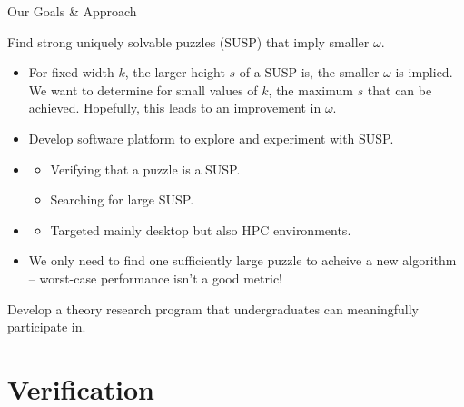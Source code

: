 \documentclass[t,10pt,
mathserif,xcolor=dvipsnames]{beamer}
\begin{document}
\begin{myframe}{Our Goals \& Approach}

   Find strong uniquely solvable puzzles (SUSP) that imply smaller $\omega$.

  \medskip
  
  \begin{itemize}
  \item For fixed width $k$, the larger height $s$ of a SUSP is, the
    smaller $\omega$ is implied. We want to determine for small values
    of $k$, the maximum $s$ that can be achieved.  Hopefully, this
    leads to an improvement in $\omega$.
  \item Develop software platform to explore and experiment with SUSP.
  \item {}
    \begin{itemize}
    \item Verifying that a puzzle is a SUSP.
    \item Searching for large SUSP.
    \end{itemize}
  \item {}
    \begin{itemize}
    \item Targeted mainly desktop but also HPC environments.
    \end{itemize}
  \item We only need to find one sufficiently large puzzle to acheive
    a new algorithm -- worst-case performance isn't a good metric!
  \end{itemize}

  \medskip
  
   Develop a theory research program that
  undergraduates can meaningfully participate in.
  
  
  
\end{myframe}

\section{Verification}


\newcommand\coNP{\ensuremath{\mathrm{coNP}}}
\end{document}
